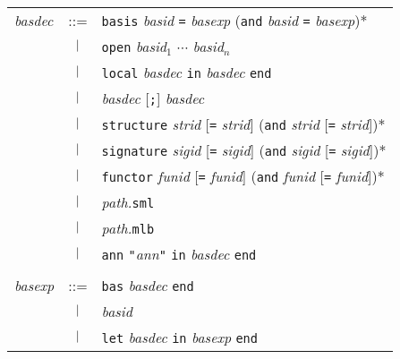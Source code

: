 \begin{latexonly}
\begin{center}
\begin{tabular}{lcl}
{\it basdec} 
& ::=    & {\tt basis} {\it basid} {\tt =} {\it basexp}
            ({\tt and} {\it basid} {\tt =} {\it basexp})* \\
& $\ |\ $ & {\tt open} {\it basid}$_1$ $\cdots$ {\it basid}$_n$ \\
& $\ |\ $ & {\tt local} {\it basdec} {\tt in} {\it basdec} {\tt end} \\
& $\ |\ $ & {\it basdec} [{\tt;}] {\it basdec} \\
& $\ |\ $ & {\tt structure} {\it strid} [{\tt =} {\it strid}] 
                ({\tt and} {\it strid} [{\tt =} {\it strid}])* \\
& $\ |\ $ & {\tt signature} {\it sigid} [{\tt =} {\it sigid}] 
                ({\tt and} {\it sigid} [{\tt =} {\it sigid}])* \\
& $\ |\ $ &   {\tt functor} {\it funid} [{\tt =} {\it funid}] 
                ({\tt and} {\it funid} [{\tt =} {\it funid}])* \\
& $\ |\ $ & {\it path.}{\tt sml} \\
& $\ |\ $ & {\it path.}{\tt mlb} \\
& $\ |\ $ & {\tt ann} {\tt"}{\it ann}{\tt"} {\tt in} {\it basdec} {\tt end} \\
\\
{\it basexp}
& ::=    & {\tt bas} {\it basdec} {\tt end} \\
& $\ |\ $ & {\it basid} \\
& $\ |\ $ & {\tt let} {\it basdec} {\tt in} {\it basexp} {\tt end}
\end{tabular}
\end{center}
\end{latexonly}
